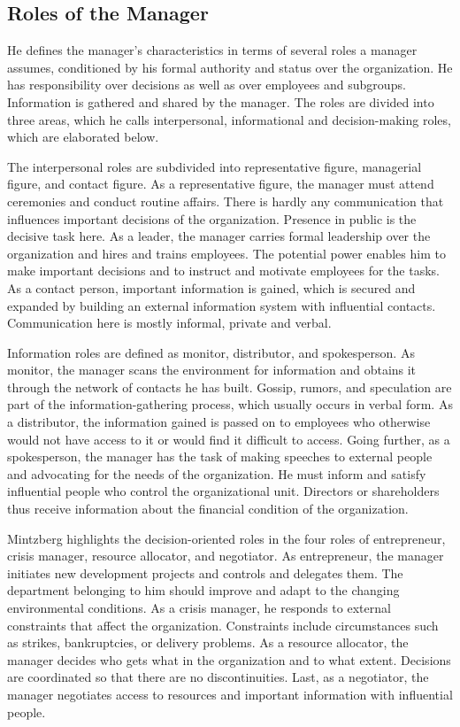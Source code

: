 \documentclass[a4paper,12pt]{article}
\begin{document}
\subsection{Roles of the Manager}

He defines the manager's characteristics in terms of several roles a manager
\cite{Mintzberg} assumes, conditioned by his formal authority and status over
the organization. He has responsibility over decisions as well as over
employees and subgroups. Information is gathered and shared by the
manager. The roles are divided into three areas, which he calls interpersonal,
informational and decision-making roles, which are elaborated below.

The interpersonal roles are subdivided into representative figure, managerial
figure, and contact figure. As a representative figure, the manager must
attend ceremonies and conduct routine affairs. There is hardly any
communication that influences important decisions of the
organization. Presence in public is the decisive task here. As a leader, the
manager carries formal leadership over the organization and hires and trains
employees. The potential power enables him to make important decisions and to
instruct and motivate employees for the tasks. As a contact person, important
information is gained, which is secured and expanded by building an external
information system with influential contacts. Communication here is mostly
informal, private and verbal.

Information roles are defined as monitor, distributor, and spokesperson. As
monitor, the manager scans the environment for information and obtains it
through the network of contacts he has built. Gossip, rumors, and speculation
are part of the information-gathering process, which usually occurs in verbal
form. As a distributor, the information gained is passed on to employees who
otherwise would not have access to it or would find it difficult to
access. Going further, as a spokesperson, the manager has the task of making
speeches to external people and advocating for the needs of the
organization. He must inform and satisfy influential people who control the
organizational unit. Directors or shareholders thus receive information about
the financial condition of the organization.

Mintzberg highlights the decision-oriented roles in the four roles of
entrepreneur, crisis manager, resource allocator, and negotiator. As
entrepreneur, the manager initiates new development projects and controls and
delegates them. The department belonging to him should improve and adapt to
the changing environmental conditions. As a crisis manager, he responds to
external constraints that affect the organization. Constraints include
circumstances such as strikes, bankruptcies, or delivery problems. As a
resource allocator, the manager decides who gets what in the organization and
to what extent. Decisions are coordinated so that there are no
discontinuities. Last, as a negotiator, the manager negotiates access to
resources and important information with influential people.
\end{document}
